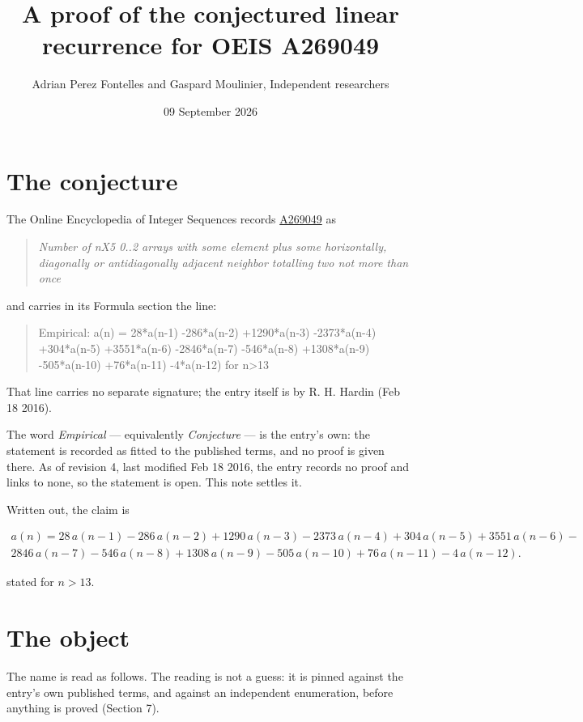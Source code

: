 \documentclass[11pt]{article}
\title{A proof of the conjectured linear recurrence for OEIS A269049}
\author{Adrian Perez Fontelles and Gaspard Moulinier, Independent researchers}
\date{09 September 2026}
\theoremstyle{definition}
\begin{document}
\maketitle
\section{The conjecture}

The Online Encyclopedia of Integer Sequences records \href{https://oeis.org/A269049}{A269049} as

\begin{quote}\itshape Number of nX5 0..2 arrays with some element plus some horizontally, diagonally or antidiagonally adjacent neighbor totalling two not more than once\end{quote}

and carries in its Formula section the line:

\begin{quote}\ttfamily Empirical: a(n) = 28*a(n-1) -286*a(n-2) +1290*a(n-3) -2373*a(n-4) +304*a(n-5) +3551*a(n-6) -2846*a(n-7) -546*a(n-8) +1308*a(n-9) -505*a(n-10) +76*a(n-11) -4*a(n-12) for n>13\end{quote}

That line carries no separate signature; the entry itself is by R. H. Hardin (Feb 18 2016).

The word {\itshape Empirical} --- equivalently {\itshape Conjecture} --- is the entry's own: the statement is recorded as fitted to the published terms, and no proof is given there. As of revision 4, last modified Feb 18 2016, the entry records no proof and links to none, so the statement is open. This note settles it.

Written out, the claim is

\begin{multline*} a(n) = 28\,a(n-1) - 286\,a(n-2) + 1290\,a(n-3) - 2373\,a(n-4) + 304\,a(n-5) + 3551\,a(n-6) - \\ 2846\,a(n-7) - 546\,a(n-8) + 1308\,a(n-9) - 505\,a(n-10) + 76\,a(n-11) - 4\,a(n-12). \end{multline*}

stated for $n > 13$.

\section{The object}

The name is read as follows. The reading is not a guess: it is pinned against the entry's own published terms, and against an independent enumeration, before anything is proved (Section 7).
\end{document}
